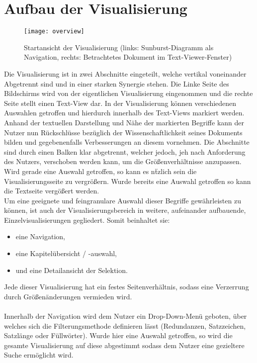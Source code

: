 \section{Aufbau der Visualisierung}
\begin{figure}[!htbp]
 \centering
 \texttt{[image: overview]}
 \caption{Startansicht der Visualisierung (links: Sunburst-Diagramm als Navigation, rechts: Betrachtetes Dokument im Text-Viewer-Fenster)}
 \label{fig:sunburst}
\end{figure}
Die Visualisierung ist in zwei Abschnitte eingeteilt, welche vertikal voneinander Abgetrennt sind und in einer starken Synergie stehen. Die Linke Seite des Bildschirms wird von der eigentlichen Visualisierung eingenommen und die rechte Seite stellt einen Text-View dar. In der Visualisierung k\"onnen verschiedenen Auswahlen getroffen und hierdurch innerhalb des Text-Views markiert werden. Anhand der textuellen Darstellung und N\"ahe der markierten Begriffe kann der Nutzer nun R\"uckschl\"usse bez\"uglich der Wissenschaftlichkeit seines Dokuments bilden und gegebenenfalls Verbesserungen an diesem vornehmen. Die Abschnitte sind durch einen Balken klar abgetrennt, welcher jedoch, jeh nach Anforderung des Nutzers, verschoben werden kann, um die Gr\"o{\ss}enverh\"altnisse anzupassen. Wird gerade eine Auswahl getroffen, so kann es n\"tzlich sein die Visualisierungsseite zu vergr\"o{\ss}ern. Wurde bereits eine Auswahl getroffen so kann die Textseite verg\"o{\ss}ert werden.\\
Um eine geeignete und feingranulare Auswahl dieser Begriffe gew\"ahrleisten zu k\"onnen, ist auch der Visualisierungsbereich in weitere, aufeinander aufbauende, Einzelvisualisierungen gegliedert. 
\newpage
Somit beinhaltet sie:
\begin{itemize} 
    \item eine Navigation,
	\item eine Kapitel\"ubersicht / -auswahl,
	\item und eine Detailansicht der Selektion. 
\end{itemize} 
Jede dieser Visualisierung hat ein festes Seitenverh\"altnis, sodass eine Verzerrung durch Gr\"o{\ss}en\"anderungen vermieden wird.\\
\\
Innerhalb der Navigation wird dem Nutzer ein Drop-Down-Men\"u geboten, \"uber welches sich die Filterungsmethode definieren l\"asst (Redundanzen, Satzzeichen, Satzl\"ange oder F\"ullw\"orter). Wurde hier eine Auswahl getroffen, so wird die gesamte Visualisierung auf diese abgestimmt sodass dem Nutzer eine gezieltere Suche erm\"oglicht wird.\\
